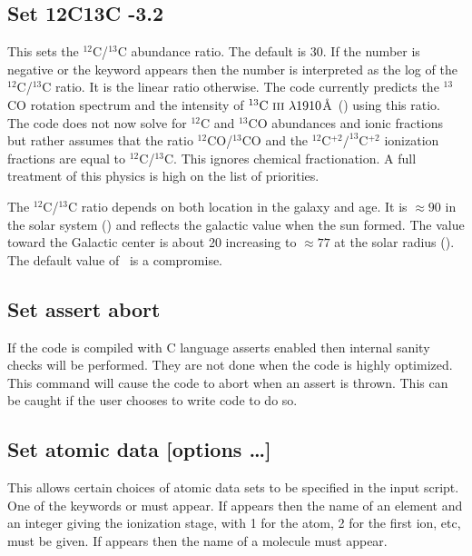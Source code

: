 \subsection{Set 12C13C -3.2}

This sets the $^{12}$C/$^{13}$C abundance ratio.
The default is 30.
If the number is negative or the keyword  appears
then the number is interpreted as
the log of the $^{12}$C/$^{13}$C ratio.
It is the linear ratio otherwise.
The code
currently predicts the $^{13}$CO rotation spectrum and
the intensity of
$^{13}\mbox{{\rm C~{\sc iii}}}\ \lambda 1910$\AA\ (\citealp{Clegg1997}) using this ratio.
The code does not now solve
for $^{12}$C and $^{13}$CO abundances and ionic fractions
but rather assumes that
the ratio $^{12}$CO/$^{13}$CO and the
$^{12}$C$^{+2}/^{13}$C$^{+2}$ ionization fractions are equal to
$^{12}$C/$^{13}$C.
This ignores chemical fractionation.
A full treatment of this physics is high on the list of priorities.

The $^{12}$C/$^{13}$C ratio depends on both location in the
galaxy and age.
It is $\approx 90$ in the solar system (\citealp{Anders1989})
and reflects the galactic value when the sun formed.
The value toward the Galactic center
is about 20 increasing to $\approx77$ at the solar radius
(\citealp{Wilson1994}).
The default value of \LIMELM\ is a compromise.

\subsection{Set assert abort}

If the code is compiled
with C language asserts enabled then internal sanity checks will be
performed.
They are not done when the code is highly optimized.  This
command will cause the code to abort when an assert is thrown.
This can
be caught if the user chooses to write code to do so.

\subsection{Set atomic data [options \dots]}

This allows certain choices of atomic data sets to be specified in the
input script.
One of the keywords  or 
must appear.
If 
appears then the name of an element and an integer giving the ionization
stage, with 1 for the atom, 2 for the first ion, etc, must be given.
If
 appears then the name of a molecule must appear.

